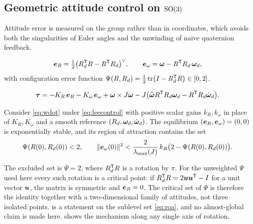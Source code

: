 \subsection{Geometric attitude control on \texorpdfstring{$\mathrm{SO}(3)$}{SO(3)}}

Attitude error is measured on the group rather than in coordinates, which
avoids both the singularities of Euler angles and the unwinding of naive
quaternion feedback.

\begin{definition}
\begin{equation}
  \bm{e}_R = \tfrac12\big(R_d^{\mathsf{T}} R - R^{\mathsf{T}} R_d\big)^{\vee},
  \qquad
  \bm{e}_\omega = \bm{\omega} - R^{\mathsf{T}} R_d\,\bm{\omega}_d ,
  \label{eq:attitudeerror}
\end{equation}
with configuration error function
$\Psi(R,R_d) = \tfrac12\operatorname{tr}\!\big(I - R_d^{\mathsf{T}} R\big) \in [0,2]$.
\end{definition}

\begin{model}
\label{mod:leecontrol}
\begin{equation}
  \bm{\tau} = -K_R\,\bm{e}_R - K_\omega\,\bm{e}_\omega
              + \bm{\omega}\times J\bm{\omega}
              - J\big(\widehat{\bm{\omega}}R^{\mathsf{T}} R_d\bm{\omega}_d
                      - R^{\mathsf{T}} R_d\dot{\bm{\omega}}_d\big) .
  \label{eq:leecontrol}
\end{equation}
\end{model}

\begin{theorem}
\label{thm:lee}
Consider \cref{eq:wdot} under \cref{eq:leecontrol} with positive scalar gains
$k_R,k_\omega$ in place of $K_R,K_\omega$ and a smooth reference
$(R_d,\bm{\omega}_d,\dot{\bm{\omega}}_d)$. The equilibrium
$(\bm{e}_R,\bm{e}_\omega)=(0,0)$ is exponentially stable, and its region of
attraction contains the set
\begin{equation}
  \Psi(R(0),R_d(0)) < 2,
  \qquad
  \|\bm{e}_\omega(0)\|^2 < \frac{2}{\lambda_{\max}(J)}\,k_R\big(2-\Psi(R(0),R_d(0))\big) .
  \label{eq:roa}
\end{equation}
\end{theorem}

The excluded set is $\Psi=2$, where $R_d^{\mathsf{T}} R$ is a rotation by $\pi$. For
the unweighted $\Psi$ used here every such rotation is a critical point: if
$R_d^{\mathsf{T}} R = 2\bm{u}\bm{u}^{\mathsf{T}} - I$ for a unit vector $\bm{u}$, the
matrix is symmetric and $\bm{e}_R=0$. The critical set of $\Psi$ is therefore
the identity together with a two-dimensional family of attitudes, not three
isolated points.  is a statement on the sublevel set
\cref{eq:roa}, and no almost-global claim is made here.  shows
the mechanism along any single axis of rotation.

